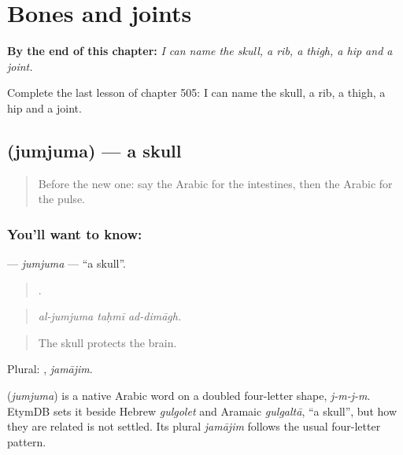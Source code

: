 
\chapter{Bones and joints}
\label{ch:ar-bones-and-joints}

\begin{chapteropening}
\textbf{By the end of this chapter:} \emph{I can name the skull, a rib, a thigh, a hip and a joint.}

Complete the last lesson of chapter 505: I can name the skull, a rib, a thigh, a hip and a joint.
\end{chapteropening}

\section[\texorpdfstring{\ar{جمجمة} (jumjuma)}{جمجمة (jumjuma)}]{ (jumjuma) — a skull}

\label{lesson:AR-C505-jumjuma}



\begin{quote}
Before the new one: say the Arabic for the intestines, then the Arabic for the pulse.
\end{quote}

\subsection*{You'll want to know: }
\textbf{} — \emph{jumjuma} — \textquotedblleft{}a skull\textquotedblright{}.

\begin{quote}
  .
\end{quote}

\begin{quote}
\emph{al-jumjuma taḥmī ad-dimāgh.}
\end{quote}

\begin{quote}
The skull protects the brain.
\end{quote}

Plural: , \emph{jamājim}.

\begin{cousinweb}
\textbf{} (\emph{jumjuma}) is a native Arabic word on a doubled four-letter shape, \emph{j-m-j-m}. EtymDB sets it beside Hebrew \emph{gulgolet} and Aramaic \emph{gulgaltā}, \textquotedblleft{}a skull\textquotedblright{}, but how they are related is not settled. Its plural \emph{jamājim} follows the usual four-letter pattern.
\end{cousinweb}

